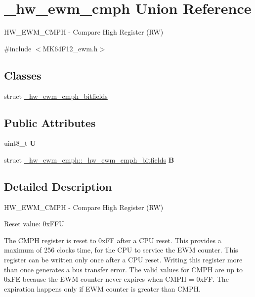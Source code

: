 \hypertarget{union__hw__ewm__cmph}{}\section{\+\_\+hw\+\_\+ewm\+\_\+cmph Union Reference}
\label{union__hw__ewm__cmph}


H\+W\+\_\+\+E\+W\+M\+\_\+\+C\+M\+PH -\/ Compare High Register (RW)  




{\ttfamily \#include $<$M\+K64\+F12\+\_\+ewm.\+h$>$}

\subsection*{Classes}
\begin{DoxyCompactItemize}
\item 
struct \hyperlink{struct__hw__ewm__cmph_1_1__hw__ewm__cmph__bitfields}{\+\_\+hw\+\_\+ewm\+\_\+cmph\+\_\+bitfields}
\end{DoxyCompactItemize}
\subsection*{Public Attributes}
\begin{DoxyCompactItemize}
\item 
uint8\+\_\+t {\bfseries U}\hypertarget{union__hw__ewm__cmph_a74bf51307ff0dc1e407f167d13ce9b22}{}\label{union__hw__ewm__cmph_a74bf51307ff0dc1e407f167d13ce9b22}

\item 
struct \hyperlink{struct__hw__ewm__cmph_1_1__hw__ewm__cmph__bitfields}{\+\_\+hw\+\_\+ewm\+\_\+cmph\+::\+\_\+hw\+\_\+ewm\+\_\+cmph\+\_\+bitfields} {\bfseries B}\hypertarget{union__hw__ewm__cmph_af1291b26d8cbfd524e1fc1d9f4d020cd}{}\label{union__hw__ewm__cmph_af1291b26d8cbfd524e1fc1d9f4d020cd}

\end{DoxyCompactItemize}


\subsection{Detailed Description}
H\+W\+\_\+\+E\+W\+M\+\_\+\+C\+M\+PH -\/ Compare High Register (RW) 

Reset value\+: 0x\+F\+FU

The C\+M\+PH register is reset to 0x\+FF after a C\+PU reset. This provides a maximum of 256 clocks time, for the C\+PU to service the E\+WM counter. This register can be written only once after a C\+PU reset. Writing this register more than once generates a bus transfer error. The valid values for C\+M\+PH are up to 0x\+FE because the E\+WM counter never expires when C\+M\+PH = 0x\+FF. The expiration happens only if E\+WM counter is greater than C\+M\+PH. 

